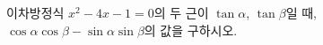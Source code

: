 이차방정식 $x^2-4x-1=0$의 두 근이 $\tan\alpha$, $\tan\beta$일 때, $\cos\alpha\cos\beta-\sin\alpha\sin\beta$의 값을 구하시오. 
